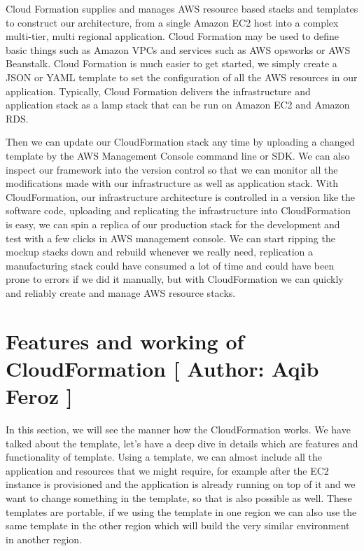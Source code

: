 Cloud Formation supplies and manages AWS resource based stacks and templates to construct our architecture, from a single Amazon EC2 host into a complex multi-tier, multi regional application. Cloud Formation may be used to define basic things such as Amazon VPCs and services such as AWS opsworks or AWS Beanstalk. Cloud Formation is much easier to get started, we simply create a JSON or YAML template to set the configuration of all the AWS resources in our application. Typically, Cloud Formation delivers the infrastructure and application stack as a lamp stack that can be run on Amazon EC2 and Amazon RDS.

Then we can update our CloudFormation stack any time by uploading a changed template by the AWS Management Console command line or SDK. We can also inspect our framework into the version control so that we can monitor all the modifications made with our infrastructure as well as application stack. With CloudFormation, our infrastructure architecture is controlled in a version like the software code, uploading and replicating the infrastructure into CloudFormation is easy, we can spin a replica of our production stack for the development and test with a few clicks in AWS management console. We can start ripping the mockup stacks down and rebuild whenever we really need, replication a manufacturing stack could have consumed a lot of time and could have been prone to errors if we did it manually, but with CloudFormation we can quickly and reliably create and manage AWS resource stacks.

\section{Features and working of CloudFormation [ Author: Aqib Feroz ]}
In this section, we will see the manner how the CloudFormation works. We have talked about the template, let’s have a deep dive in details which are features and functionality of template. Using a template, we can almost include all the application and resources that we might require, for example after the EC2 instance is provisioned and the application is already running on top of it and we want to change something in the template, so that is also possible as well. These templates are portable, if we using the template in one region we can also use the same template in the other region which will build the very similar environment in another region.

